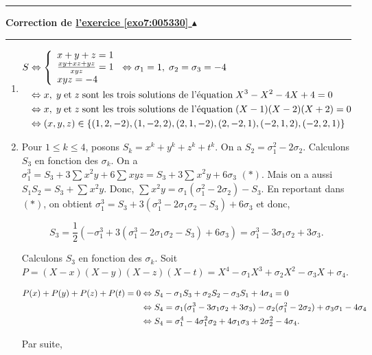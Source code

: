 \documentclass[11pt,a4paper]{article}
\newcounter{exo}
\newcommand{\correction}[1]{\hypertarget{cor7:#1}{}\label{cor7:#1}{\bf Correction de \hyperlink{exo7:#1}{l'exercice \ref{exo7:#1} $\blacktriangle$}}\vspace{1mm}\hrule\vspace{1mm}}
\newcommand{\fincorrection}{\vspace{1mm}\hrule\vspace*{7mm}}
\begin{document}
\fincorrection
\correction{005330}
\begin{enumerate}
\item  
\begin{align*}\ensuremath
S&\Leftrightarrow\left\{
\begin{array}{l}
x+y+z=1\\
\frac{xy+xz+yz}{xyz}=1\\
xyz=-4
\end{array}\right.\Leftrightarrow\sigma_1=1,\;\sigma_2=\sigma_3=-4\\
 &\Leftrightarrow x,\;y\;\mbox{et}\;z\;\mbox{sont les trois solutions de l'équation}\;X^3-X^2-4X+4=0\\
 &\Leftrightarrow x,\;y\;\mbox{et}\;z\;\mbox{sont les trois solutions de l'équation}\;(X-1)(X-2)(X+2)=0\\
 &\Leftrightarrow(x,y,z)\in\{(1,2,-2),(1,-2,2),(2,1,-2),(2,-2,1),(-2,1,2),(-2,2,1)\}
\end{align*}

\item  Pour $1\leq k\leq 4$, posons $S_k=x^k+y^k+z^k+t^k$. On a $S_2=\sigma_1^2-2\sigma_2$. Calculons $S_3$ en fonction des $\sigma_k$. On a $\sigma_1^3=S_3+3\sum_{}^{}x^2y+6\sum_{}^{}xyz=S_3+3\sum_{}^{}x^2y+6\sigma_3$ $(*)$. Mais on a aussi $S_1S_2=S_3+\sum_{}^{}x^2y$. Donc, $\sum_{}^{}x^2y=\sigma_1(\sigma_1^2-2\sigma_2)-S_3$. En reportant dans $(*)$, on obtient $\sigma_1^3=S_3+3(\sigma_1^3-2\sigma_1\sigma_2-S_3)+6\sigma_3$ et donc,

$$S_3=\frac{1}{2}(-\sigma_1^3+3(\sigma_1^3-2\sigma_1\sigma_2-S_3)+6\sigma_3)=\sigma_1^3-3\sigma_1\sigma_2+3\sigma_3.$$

Calculons $S_3$ en fonction des $\sigma_k$. Soit $P=(X-x)(X-y)(X-z)(X-t)=X^4-\sigma_1X^3+\sigma_2X^2-\sigma_3X+\sigma_4$.

\begin{align*}\ensuremath
P(x)+P(y)+P(z)+P(t)=0&\Leftrightarrow S_4-\sigma_1S_3+\sigma_2S_2-\sigma_3S_1+4\sigma_4=0\\
 &\Leftrightarrow S_4=\sigma_1(\sigma_1^3-3\sigma_1\sigma_2+3\sigma_3)-\sigma_2(\sigma_1^2-2\sigma_2)+\sigma_3\sigma_1-4\sigma_4\\
 &\Leftrightarrow S_4=\sigma_1^4-4\sigma_1^2\sigma_2+4\sigma_1\sigma_3+2\sigma_2^2-4\sigma_4.
\end{align*}

Par suite,


\end{enumerate}
\end{document}

